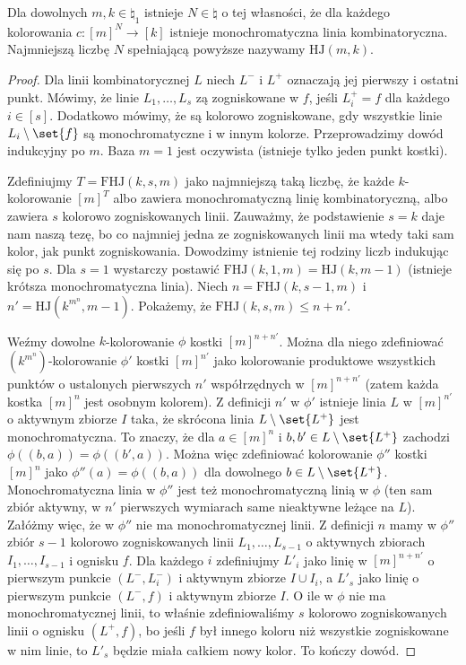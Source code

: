 \begin{theorem}
	Dla dowolnych $m, k \in \natural_1$ istnieje $N \in \natural$ o tej własności, że
	dla każdego kolorowania $c: {[m]}^N \to [k]$ istnieje monochromatyczna linia kombinatoryczna.
	Najmniejszą liczbę $N$ spełniającą powyższe nazywamy $\text{HJ}(m, k)$.
\end{theorem}
\begin{proof}
	Dla linii kombinatorycznej $L$ niech $L^-$ i $L^+$ oznaczają jej pierwszy i ostatni punkt. Mówimy, że linie $L_1,\ldots, L_s$ zą zogniskowane w $f$, jeśli $L^+_i = f$ dla każdego $i\in[s]$.
	Dodatkowo mówimy, że są kolorowo zogniskowane, gdy wszystkie linie $L_i\setminus\set{f}$ są monochromatyczne i w innym kolorze.
	Przeprowadzimy dowód indukcyjny po $m$. Baza $m=1$ jest oczywista (istnieje tylko jeden punkt kostki).

	Zdefiniujmy $T = \text{FHJ}(k,s,m)$ jako najmniejszą taką liczbę, że każde $k$-kolorowanie $[m]^T$ albo zawiera monochromatyczną linię kombinatoryczną, albo zawiera $s$ kolorowo zogniskowanych linii.
	Zauważmy, że podstawienie $s=k$ daje nam naszą tezę, bo co najmniej jedna ze zogniskowanych linii ma wtedy taki sam kolor, jak punkt zogniskowania.
	Dowodzimy istnienie tej rodziny liczb indukując się po $s$. Dla $s=1$ wystarczy postawić $\text{FHJ}(k,1,m) = \text{HJ}(k,m-1)$ (istnieje krótsza monochromatyczna linia).
	Niech $n = \text{FHJ}(k,s-1,m)$ i $n' = \text{HJ}(k^{m^n},m-1)$. Pokażemy, że $\text{FHJ}(k,s,m) \le n+n'$.

	Weźmy dowolne $k$-kolorowanie $\phi$ kostki $[m]^{n+n'}$. Można dla niego zdefiniować $(k^{m^n})$-kolorowanie $\phi'$
	kostki $[m]^{n'}$ jako kolorowanie produktowe wszystkich punktów o ustalonych pierwszych $n'$ współrzędnych w $[m]^{n+n'}$
	(zatem każda kostka $[m]^n$ jest osobnym kolorem). Z definicji $n'$ w $\phi'$ istnieje linia $L$ w $[m]^{n'}$ o aktywnym
	zbiorze $I$ taka, że skrócona linia $L\setminus\set{L^+}$ jest monochromatyczna. To znaczy, że dla $a\in[m]^n$
	i $b,b'\in L\setminus\set{L^+}$ zachodzi $\phi((b,a)) = \phi((b',a))$. Można więc zdefiniować kolorowanie
	$\phi''$ kostki $[m]^n$ jako $\phi''(a) = \phi((b,a))$ dla dowolnego $b\in L\setminus\set{L^+}$.
	Monochromatyczna linia w $\phi''$ jest też monochromatyczną linią w $\phi$ (ten sam zbiór aktywny, w $n'$ pierwszych wymiarach same nieaktywne leżące na $L$).
	Załóżmy więc, że w $\phi''$ nie ma monochromatycznej linii. Z definicji $n$ mamy w $\phi''$ zbiór $s-1$ kolorowo zogniskowanych linii
	$L_1,\ldots,L_{s-1}$ o aktywnych zbiorach $I_1,\ldots,I_{s-1}$ i ognisku $f$. Dla każdego $i$ zdefiniujmy $L'_i$ jako linię w
	$[m]^{n+n'}$ o pierwszym punkcie $(L^-,L_i^-)$ i aktywnym zbiorze $I\cup I_i$, a $L'_s$ jako linię o pierwszym punkcie $(L^-,f)$
	i aktywnym zbiorze $I$. O ile w $\phi$ nie ma monochromatycznej linii, to właśnie zdefiniowaliśmy $s$ kolorowo zogniskowanych linii
	o ognisku $(L^+,f)$, bo jeśli $f$ był innego koloru niż wszystkie zogniskowane w nim linie, to $L'_s$ będzie miała całkiem nowy kolor.
	To kończy dowód.
\end{proof}

